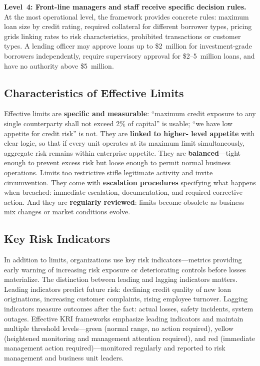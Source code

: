 \documentclass[11pt,openany]{book}
\begin{document}
\textbf{Level~4: Front-line managers and staff receive specific decision rules.}
At the most operational level, the framework provides concrete rules: maximum
loan size by credit rating, required collateral for different borrower types,
pricing grids linking rates to risk characteristics, prohibited transactions or
customer types. A lending officer may approve loans up to \$2~million for
investment-grade borrowers independently, require supervisory approval for
\$2--5~million loans, and have no authority above \$5~million.

\subsection{Characteristics of Effective Limits}
\label{subsec:effective-limits}

Effective limits are \textbf{specific and measurable}: ``maximum credit exposure
to any single counterparty shall not exceed 2\% of capital'' is usable; ``we
have low appetite for credit risk'' is not. They are \textbf{linked to higher-
level appetite} with clear logic, so that if every unit operates at its maximum
limit simultaneously, aggregate risk remains within enterprise appetite. They
are \textbf{balanced}---tight enough to prevent excess risk but loose enough to
permit normal business operations. Limits too restrictive stifle legitimate
activity and invite circumvention. They come with \textbf{escalation
procedures} specifying what happens when breached: immediate escalation,
documentation, and required corrective action. And they are \textbf{regularly
reviewed}: limits become obsolete as business mix changes or market conditions
evolve.

\subsection{Key Risk Indicators}
\label{subsec:kris}

In addition to limits, organizations use key risk indicators---metrics providing
early warning of increasing risk exposure or deteriorating controls before losses
materialize. The distinction between leading and lagging indicators matters.
Leading indicators predict future risk: declining credit quality of new loan
originations, increasing customer complaints, rising employee turnover.
Lagging indicators measure outcomes after the fact: actual losses, safety
incidents, system outages. Effective KRI frameworks emphasize leading indicators
and maintain multiple threshold levels---green (normal range, no action
required), yellow (heightened monitoring and management attention required),
and red (immediate management action required)---monitored regularly and
reported to risk management and business unit leaders.
\end{document}
